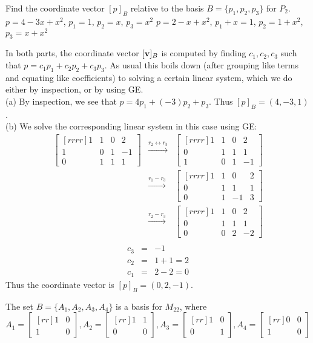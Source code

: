 \ii Find the coordinate vector $[p]_B$ relative to the basis $B= \{p_1,p_2,p_3\}$ for $P_2$.
\bb
\ii $p = 4 -3x +x^2$, $p_1 = 1$, $p_2 = x$, $p_3 = x^2$
\ii $p = 2 -x +x^2$, $p_1+x = 1$, $p_2 = 1+x^2$, $p_3 = x+x^2$
\ee
\begin{solution}
\noindent In both parts, the coordinate vector $[{\mathbf v}]_B$ is computed by finding $c_1,c_2,c_3$ such that $p=c_1p_1+c_2p_2+c_3p_3$. As usual this boils down (after grouping like terms and equating like coefficients) to solving a certain linear system, which we do either by inspection, or by using GE. 
\\
(a)  By inspection, we see that $p=4p_1+(-3)p_2+p_3$. Thus $[p]_B=(4,-3,1)$. 
\\
(b) We solve the corresponding linear system in this case using GE:
\begin{eqnarray*}
\begin{bmatrix}[rrrr]
1&1&0&2\\
1&0&1&-1\\
0&1&1&1
\end{bmatrix}
&\xrightarrow[]{r_2\leftrightarrow r_3}&
\begin{bmatrix}[rrrr]
1&1&0&2\\
0&1&1&1\\
1&0&1&-1
\end{bmatrix}\\
&\xrightarrow[]{r_1 -r_3}&
\begin{bmatrix}[rrrr]
1&1&0&2\\
0&1&1&1\\
0&1&-1&3
\end{bmatrix}\\
&\xrightarrow[]{r_2 -r_3}&
\begin{bmatrix}[rrrr]
1&1&0&2\\
0&1&1&1\\
0&0&2&-2
\end{bmatrix}\\
\end{eqnarray*}
\begin{eqnarray*}
c_3 &=& -1\\
c_2 &=& 1 + 1 = 2\\
c_1 &=& 2-2 = 0
\end{eqnarray*}
Thus the coordinate vector is $[p]_B=(0,2,-1)$.
\end{solution}
\ii The set $B = \{A_1,A_2,A_3,A_4\}$ is a basis for $M_{22}$, where 
$$
A_1 =
\begin{bmatrix}[rr]
1&0\\
1&0
\end{bmatrix}
, A_2=
\begin{bmatrix}[rr]
1&1\\
0&0
\end{bmatrix}
, A_3 = 
\begin{bmatrix}[rr]
1&0\\
0&1
\end{bmatrix}
, A_4 = 
\begin{bmatrix}[rr]
0&0\\
1&0
\end{bmatrix}
$$

